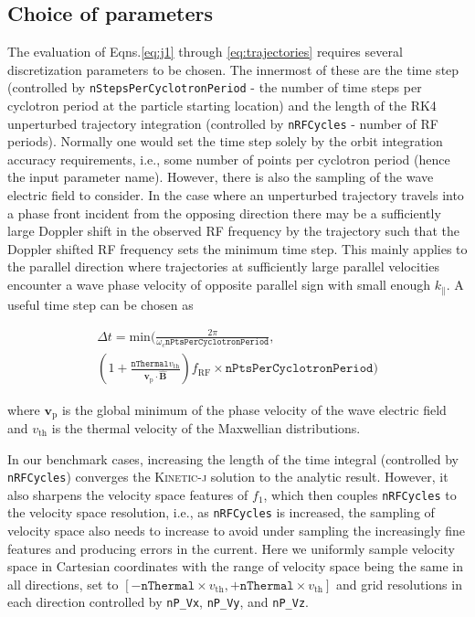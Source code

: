 \documentclass[final,5p,times,twocolumn]{elsarticle}
\let\oldhat\hat
\renewcommand{\vec}[1]{\mathbf{#1}}
\renewcommand{\hat}[1]{\oldhat{\mathbf{#1}}}
\newcommand{\kj}{\textsc{Kinetic-j}\xspace}
\begin{document}
\subsection{Choice of parameters}
\label{section:parameters}
%
The evaluation of Eqns.\ref{eq:j1} through \ref{eq:trajectories} requires several discretization parameters to be chosen. The innermost of these are the time step (controlled by \texttt{nStepsPerCyclotronPeriod} - the number of time steps per cyclotron period at the particle starting location)  and the length of the RK4 unperturbed trajectory integration (controlled by \texttt{nRFCycles} - number of RF periods). Normally one would set the time step solely by the orbit integration accuracy requirements, i.e., some number of points per cyclotron period (hence the input parameter name). However, there is also the sampling of the wave electric field to consider. In the case where an unperturbed trajectory travels into a phase front incident from the opposing direction there may be a sufficiently large Doppler shift in the observed RF frequency by the trajectory such that the Doppler shifted RF frequency sets the minimum time step. This mainly applies to the parallel direction where trajectories at sufficiently large parallel velocities encounter a wave phase velocity of opposite parallel sign with small enough $k_{\parallel}$. A useful time step can be chosen as 
%
\begin{linenomath}
\begin{equation}
\begin{split}
\label{eq:min_dt}
\Delta t=\mathrm{min}\Bigg(\frac{2\pi}{\omega_c\texttt{nPtsPerCyclotronPeriod}} ,\\ \left(1+\frac{\texttt{nThermal}v_{\mathrm{th}}}{\vec{v}_{\mathrm{p}}\cdot\hat{\vec{B}}}\right)f_{\mathrm{RF}}\times\texttt{nPtsPerCyclotronPeriod}\Bigg)
\end{split}
\end{equation}
\end{linenomath}
%
where $\vec{v}_\mathrm{p}$ is the global minimum of the phase velocity of the wave electric field and $v_{\mathrm{th}}$ is the thermal velocity of the Maxwellian distributions.  

In our benchmark cases, increasing the length of the time integral (controlled by \texttt{nRFCycles}) converges the \kj solution to the analytic result. However, it also sharpens the velocity space features of $f_\mathrm{1}$, which then couples \texttt{nRFCycles} to the velocity space resolution, i.e., as \texttt{nRFCycles} is increased, the sampling of velocity space also needs to increase to avoid under sampling the increasingly fine features and producing errors in the current. Here we uniformly sample velocity space in Cartesian coordinates with the range of velocity space being the same in all directions, set to $[-\texttt{nThermal}\times v_{\mathrm{th}},+\texttt{nThermal}\times v_{\mathrm{th}}]$ and grid resolutions in each direction controlled by \texttt{nP\_Vx}, \texttt{nP\_Vy}, and \texttt{nP\_Vz}. 
\end{document}
